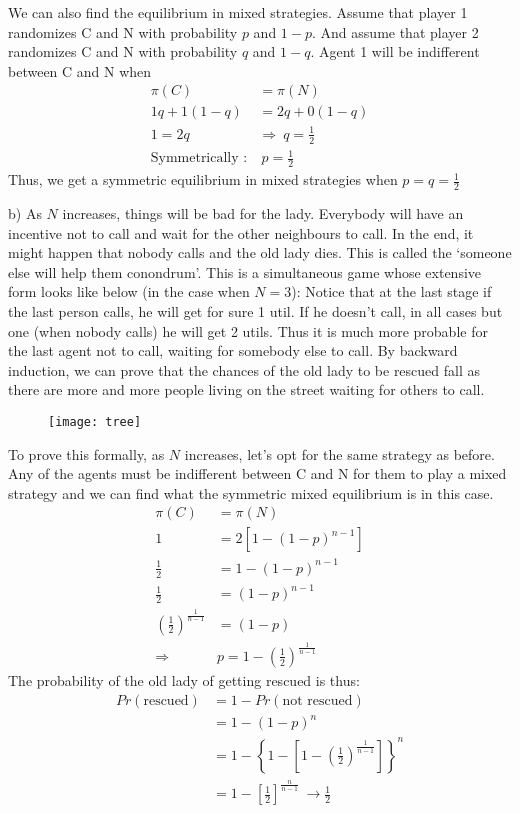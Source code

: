 \documentclass[letter,11pt]{article}
\begin{document}
 We can also find the equilibrium in mixed strategies. Assume that player 1 randomizes C and N with probability $p$ and $1-p$. And assume that player 2 randomizes C and N with probability $q$ and $1-q$. Agent 1 will be indifferent between C and N when 
\begin{align*}
\pi(C) &= \pi(N) \\
1q + 1(1-q) &= 2q + 0(1-q) \\
1 = 2q \ &\Rightarrow \ q =\frac{1}{2} \\
 \text{Symmetrically :}  & \ p = \frac{1}{2}
\end{align*}
Thus, we get a symmetric equilibrium in mixed strategies when $p = q= \frac{1}{2}$


b) As $N$ increases, things will be bad for the lady. Everybody will have an incentive not to call and wait for the other neighbours to call. In the end, it might happen that nobody calls and the old lady dies. This is called the `someone else will help them conondrum'. This is a simultaneous game whose extensive form looks like below (in the case when $N=3$): Notice that at the last stage if the last person calls, he will get for sure 1 util. If he doesn't call, in all cases but one (when nobody calls) he will get 2 utils. Thus it is much more probable for the last agent not to call, waiting for somebody else to call. By backward induction, we can prove that the chances of the old lady to be rescued fall as there are more and more people living on the street waiting for others to call.
\begin{figure}[htpt]
     \begin{center}
\texttt{[image: tree]}
\end{center}
     \end{figure} 
To prove this formally, as $N$ increases, let's opt for the same strategy as before. Any of the agents must be indifferent between C and N for them to play a mixed strategy and we can find what the symmetric mixed equilibrium is in this case.
\begin{align*}
\pi(C) & = \pi(N) \\
1 &= 2[1-(1-p)^{n-1}] \\
\frac{1}{2} & =1-(1-p)^{n-1} \\
\frac{1}{2} & = (1-p)^{n-1} \\
\left(\frac{1}{2}\right)^{\frac{1}{n-1}} & = (1-p) \\
\Rightarrow  & \boxed{p = 1- \left(\frac{1}{2}\right)^{\frac{1}{n-1}} }
\end{align*}
The probability of the old lady of getting rescued is thus:
\begin{align*}
Pr(\text{rescued}) &= 1-Pr(\text{not rescued}) \\
& = 1- (1-p)^n \\
& = 1 - \left\{ 1- \left[   1- \left(\frac{1}{2}\right)^{\frac{1}{n-1}}   \right] \right\}^n \\
& = 1 - \left[\frac{1}{2} \right] ^{\frac{n}{n-1}} \ \rightarrow \frac{1}{2}
\end{align*}
\end{document}
